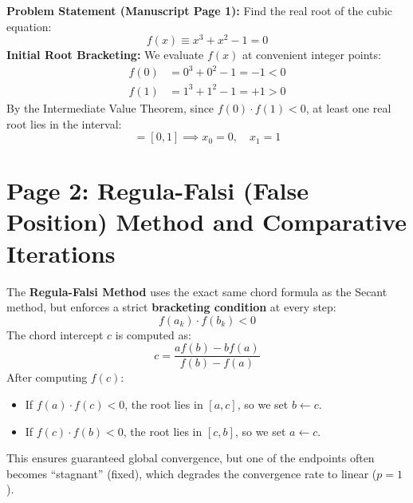 \begin{examplebox}[Manuscript Problem: Locating Root for $x^3 + x^2 - 1 = 0$]
\textbf{Problem Statement (Manuscript Page 1):}
Find the real root of the cubic equation:
\begin{equation}
    f(x) \equiv x^3 + x^2 - 1 = 0
\end{equation}
\textbf{Initial Root Bracketing:}
We evaluate $f(x)$ at convenient integer points:
\begin{align}
    f(0) &= 0^3 + 0^2 - 1 = -1 < 0 \\
    f(1) &= 1^3 + 1^2 - 1 = +1 > 0
\end{align}
By the Intermediate Value Theorem, since $f(0) \cdot f(1) < 0$, at least one real root lies in the interval:
\begin{equation}
    [a, b] = [0, 1] \implies x_0 = 0, \quad x_1 = 1
\end{equation}
\end{examplebox}

\section{Page 2: Regula-Falsi (False Position) Method and Comparative Iterations}
\label{sec:page2_regula_falsi}

\begin{conceptbox}
The \textbf{Regula-Falsi Method} uses the exact same chord formula as the Secant method, but enforces a strict \textbf{bracketing condition} at every step:
\begin{equation}
    f(a_k) \cdot f(b_k) < 0
\end{equation}
The chord intercept $c$ is computed as:
\begin{equation}
    \boxed{c = \frac{a f(b) - b f(a)}{f(b) - f(a)}}
\end{equation}
After computing $f(c)$:
\begin{itemize}[noitemsep]
    \item If $f(a) \cdot f(c) < 0$, the root lies in $[a, c]$, so we set $b \leftarrow c$.
    \item If $f(c) \cdot f(b) < 0$, the root lies in $[c, b]$, so we set $a \leftarrow c$.
\end{itemize}
This ensures guaranteed global convergence, but one of the endpoints often becomes ``stagnant'' (fixed), which degrades the convergence rate to linear ($p = 1$).
\end{conceptbox}

